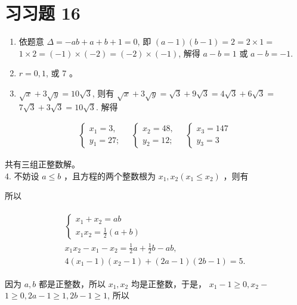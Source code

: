\documentclass[10pt]{article}
\begin{document}
\section*{习习题 16}
\begin{enumerate}
  \item 依题意 $\Delta=-a b+a+b+1=0$, 即 $(a-1)(b-1)=2=2 \times 1=$ $1 \times 2=(-1) \times(-2)=(-2) \times(-1)$, 解得 $a-b=1$ 或 $a-b=-1$.
  \item $r=0,1$, 或 7 。
  \item $\sqrt{x}+3 \sqrt{y}=10 \sqrt{3}$, 则有 $\sqrt{x}+3 \sqrt{y}=\sqrt{3}+9 \sqrt{3}=4 \sqrt{3}+6 \sqrt{3}=$ $7 \sqrt{3}+3 \sqrt{3}=10 \sqrt{3}$. 解得
\end{enumerate}

\begin{align*}
\left\{\begin{array} { l } 
{ x _ { 1 } = 3 , } \\
{ y _ { 1 } = 2 7 ; }
\end{array} \quad \left\{\begin{array} { l } 
{ x _ { 2 } = 4 8 , } \\
{ y _ { 2 } = 1 2 ; }
\end{array} \quad \left\{\begin{array}{l}
x_{3}=147 \\
y_{3}=3
\end{array}\right.\right.\right.
\end{align*}

共有三组正整数解。\\
4. 不妨设 $a \leqslant b$ ，且方程的两个整数根为 $x_{1}, x_{2}\left(x_{1} \leqslant x_{2}\right)$ ，则有

所以

\begin{align*}
\begin{gathered}
\left\{\begin{array}{l}
x_{1}+x_{2}=a b \\
x_{1} x_{2}=\frac{1}{2}(a+b)
\end{array}\right. \\
x_{1} x_{2}-x_{1}-x_{2}=\frac{1}{2} a+\frac{1}{2} b-a b, \\
4\left(x_{1}-1\right)\left(x_{2}-1\right)+(2 a-1)(2 b-1)=5 .
\end{gathered}
\end{align*}

因为 $a, b$ 都是正整数，所以 $x_{1}, x_{2}$ 均是正整数，于是， $x_{1}-1 \geqslant 0, x_{2}-$ $1 \geqslant 0,2 a-1 \geqslant 1,2 b-1 \geqslant 1$, 所以
\end{document}
